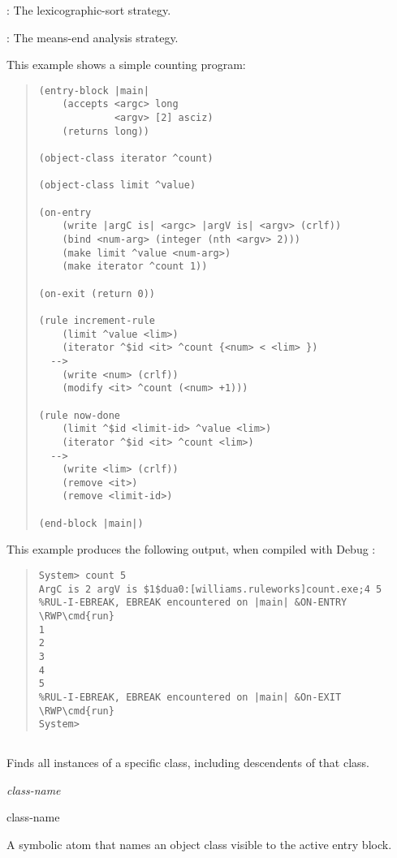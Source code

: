 : The lexicographic-sort strategy.

: The means-end analysis strategy.

\Example

This example shows a simple counting program:
\begin{quote}
\begin{verbatim}
(entry-block |main|
    (accepts <argc> long
             <argv> [2] asciz)
    (returns long))

(object-class iterator ^count)

(object-class limit ^value)

(on-entry
    (write |argC is| <argc> |argV is| <argv> (crlf))
    (bind <num-arg> (integer (nth <argv> 2)))
    (make limit ^value <num-arg>)
    (make iterator ^count 1))

(on-exit (return 0))

(rule increment-rule
    (limit ^value <lim>)
    (iterator ^$id <it> ^count {<num> < <lim> })
  -->
    (write <num> (crlf))
    (modify <it> ^count (<num> +1)))

(rule now-done
    (limit ^$id <limit-id> ^value <lim>)
    (iterator ^$id <it> ^count <lim>)
  -->
    (write <lim> (crlf))
    (remove <it>)
    (remove <limit-id>)

(end-block |main|)
\end{verbatim}
\end{quote}

This example produces the following output, when compiled with
Debug :
\begin{quote}
\begin{Verbatim}[commandchars=\\\{\}]
System> count 5
ArgC is 2 argV is $1$dua0:[williams.ruleworks]count.exe;4 5
%RUL-I-EBREAK, EBREAK encountered on |main| &ON-ENTRY
\RWP\cmd{run}
1
2
3
4
5
%RUL-I-EBREAK, EBREAK encountered on |main| &On-EXIT
\RWP\cmd{run}
System>
\end{Verbatim}
\end{quote}


\subsection{}

Finds all instances of a specific class, including descendents of that
class.

\Format

 \it{class-name}

\begin{argument}
\item[class-name]

  A symbolic atom that names an object class visible to the active
  entry block.
\end{argument}


